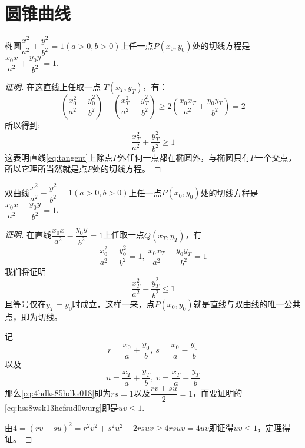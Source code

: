
\section{圆锥曲线}
\label{sec:conic-section}

\begin{theorem}
  椭圆$\dfrac{x^2}{a^2}+\dfrac{y^2}{b^2}=1(a>0,b>0)$上任一点$P(x_0,y_0)$处的切线方程是$\dfrac{x_0x}{a^2}+\dfrac{y_0y}{b^2}=1$.
\end{theorem}

\begin{proof}[证明]
在这直线上任取一点 $T(x_T,y_T)$，有：
\begin{equation}
\left(\frac{x_0^2}{a^2}+\frac{y_0^2}{b^2}\right)+\left(\frac{x_T^2}{a^2}+\frac{y_T^2}{b^2}\right) \geqslant 2\left(\frac{x_0x_T}{a^2}+\frac{y_0y_T}{b^2}\right)=2
\end{equation}
所以得到:
\begin{equation}
\frac{x_T^2}{a^2}+\frac{y_T^2}{b^2} \geqslant 1
\end{equation}
这表明直线\ref{eq:tangent}上除点$P$外任何一点都在椭圆外，与椭圆只有$P$一个交点，所以它理所当然就是点$P$处的切线方程。
\end{proof}

\begin{theorem}
  双曲线$\dfrac{x^2}{a^2}-\dfrac{y^2}{b^2}=1(a>0,b>0)$上任一点$P(x_0,y_0)$处的切线方程是$\dfrac{x_0x}{a^2}-\dfrac{y_0y}{b^2}=1$.
\end{theorem}

\begin{proof}[证明]
  在直线$\dfrac{x_0x}{a^2}-\dfrac{y_0y}{b^2}=1$上任取一点$Q(x_T,y_T)$，有
  \begin{equation}
    \label{eq:4hdks85hdks018}
   \frac{x_0^2}{a^2}-\frac{y_0^2}{b^2}=1, \  \frac{x_0x_T}{a^2}-\frac{y_0y_T}{b^2}=1 
  \end{equation}
  我们将证明
  \begin{equation}
    \label{eq:hss8wsk13hcfsud0wurg}
    \frac{x_T^2}{a^2}-\frac{y_T^2}{b^2} \leqslant 1  
  \end{equation}
  且等号仅在$y_T=y_0$时成立，这样一来，点$P(x_0,y_0)$就是直线与双曲线的唯一公共点，即为切线。

  记
  \[ r=\frac{x_0}{a}+\frac{y_0}{b}, \  s=\frac{x_0}{a}-\frac{y_0}{b} \]
  以及
  \[ u=\frac{x_T}{a}+\frac{y_T}{b}, \  v=\frac{x_T}{a}-\frac{y_T}{b} \]
  那么\autoref{eq:4hdks85hdks018}即为$rs=1$以及$\dfrac{rv+su}{2}=1$，而要证明的\autoref{eq:hss8wsk13hcfsud0wurg}即是$uv\leqslant 1$.

  由$4=(rv+su)^2=r^2v^2+s^2u^2+2rsuv \geqslant 4rsuv= 4uv$即证得$uv \leqslant 1$，定理得证。
\end{proof}

